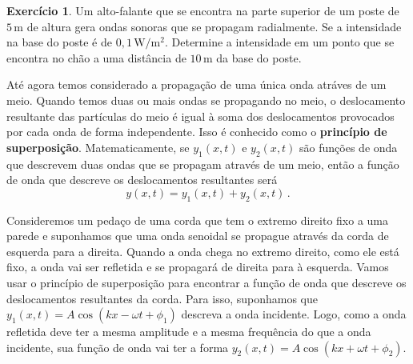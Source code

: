 \documentclass[twocolumn=on,fontsize=12pt,DIV=calc]{scrartcl}
\theoremstyle{definition}
\newtheorem{ex}{Exercício}[section]
\begin{document}
\begin{ex}
  Um alto-falante que se encontra na parte superior de um poste de
  $5\,\mathrm{m}$ de altura gera ondas sonoras que se propagam
  radialmente. Se a intensidade na base do poste é de
  $0{,}1\, \mathrm{W/m^2}$. Determine a intensidade em um ponto que se
  encontra no chão a uma distância de $10\,\mathrm{m}$ da base do
  poste.
\end{ex}

Até agora temos considerado a propagação de uma única onda atráves de
um meio. Quando temos duas ou mais ondas se propagando no meio, o
deslocamento resultante das partículas do meio é igual à soma dos
deslocamentos provocados por cada onda de forma independente. Isso é
conhecido como o \textbf{princípio de superposição}. Matematicamente,
se $y_1(x,t)$ e $y_2(x,t)$ são funções de onda que descrevem duas
ondas que se propagam através de um meio, então a função de onda que
descreve os deslocamentos resultantes será
$$y(x,t)=y_1(x,t)+y_2(x,t)\,.$$

Consideremos um pedaço de uma corda que tem o extremo direito fixo a
uma parede e suponhamos que uma onda senoidal se propague através da
corda de esquerda para a direita. Quando a onda chega no extremo
direito, como ele está fixo, a onda vai ser refletida e se propagará
de direita para à esquerda. Vamos usar o princípio de superposição
para encontrar a função de onda que descreve os deslocamentos
resultantes da corda. Para isso, suponhamos que
$y_1(x,t)=A\cos(kx-\omega t+\phi_1)$ descreva a onda incidente. Logo,
como a onda refletida deve ter a mesma amplitude e a mesma frequência
do que a onda incidente, sua função de onda vai ter a forma
$y_2(x,t)=A\cos(kx+\omega t+\phi_2)$.
\end{document}
